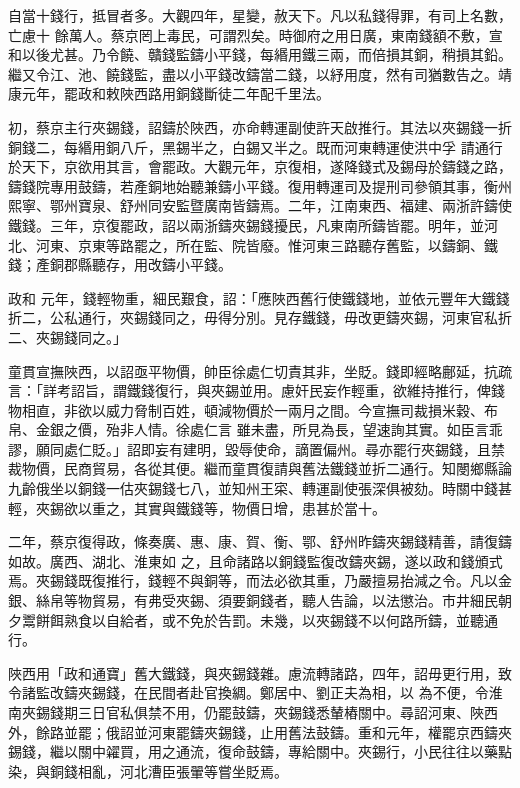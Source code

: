 \begin{pinyinscope}
 自當十錢行，抵冒者多。大觀四年，星變，赦天下。凡以私錢得罪，有司上名數，亡慮十
 餘萬人。蔡京罔上毒民，可謂烈矣。時御府之用日廣，東南錢額不敷，宣和以後尤甚。乃令饒、贛錢監鑄小平錢，每緡用鐵三兩，而倍損其銅，稍損其鉛。繼又令江、池、饒錢監，盡以小平錢改鑄當二錢，以紓用度，然有司猶數告之。靖康元年，罷政和敕陜西路用銅錢斷徒二年配千里法。



 初，蔡京主行夾錫錢，詔鑄於陜西，亦命轉運副使許天啟推行。其法以夾錫錢一折銅錢二，每緡用銅八斤，黑錫半之，白錫又半之。既而河東轉運使洪中孚
 請通行於天下，京欲用其言，會罷政。大觀元年，京復相，遂降錢式及錫母於鑄錢之路，鑄錢院專用鼓鑄，若產銅地始聽兼鑄小平錢。復用轉運司及提刑司參領其事，衡州熙寧、鄂州寶泉、舒州同安監暨廣南皆鑄焉。二年，江南東西、福建、兩浙許鑄使鐵錢。三年，京復罷政，詔以兩浙鑄夾錫錢擾民，凡東南所鑄皆罷。明年，並河北、河東、京東等路罷之，所在監、院皆廢。惟河東三路聽存舊監，以鑄銅、鐵錢；產銅郡縣聽存，用改鑄小平錢。



 政和
 元年，錢輕物重，細民艱食，詔：「應陜西舊行使鐵錢地，並依元豐年大鐵錢折二，公私通行，夾錫錢同之，毋得分別。見存鐵錢，毋改更鑄夾錫，河東官私折二、夾錫錢同之。」



 童貫宣撫陜西，以詔亟平物價，帥臣徐處仁切責其非，坐貶。錢即經略鄜延，抗疏言：「詳考詔旨，謂鐵錢復行，與夾錫並用。慮奸民妄作輕重，欲維持推行，俾錢物相直，非欲以威力脅制百姓，頓減物價於一兩月之間。今宣撫司裁損米穀、布帛、金銀之價，殆非人情。徐處仁言
 雖未盡，所見為長，望速詢其實。如臣言乖謬，願同處仁貶。」詔即妄有建明，毀辱使命，謫置偏州。尋亦罷行夾錫錢，且禁裁物價，民商貿易，各從其便。繼而童貫復請與舊法鐵錢並折二通行。知閿鄉縣論九齡俄坐以銅錢一估夾錫錢七八，並知州王寀、轉運副使張深俱被劾。時關中錢甚輕，夾錫欲以重之，其實與鐵錢等，物價日增，患甚於當十。



 二年，蔡京復得政，條奏廣、惠、康、賀、衡、鄂、舒州昨鑄夾錫錢精善，請復鑄如故。廣西、湖北、淮東如
 之，且命諸路以銅錢監復改鑄夾錫，遂以政和錢頒式焉。夾錫錢既復推行，錢輕不與銅等，而法必欲其重，乃嚴擅易抬減之令。凡以金銀、絲帛等物貿易，有弗受夾錫、須要銅錢者，聽人告論，以法懲治。市井細民朝夕鬻餅餌熟食以自給者，或不免於告罰。未幾，以夾錫錢不以何路所鑄，並聽通行。



 陜西用「政和通寶」舊大鐵錢，與夾錫錢雜。慮流轉諸路，四年，詔毋更行用，致令諸監改鑄夾錫錢，在民間者赴官換綢。鄭居中、劉正夫為相，以
 為不便，令淮南夾錫錢期三日官私俱禁不用，仍罷鼓鑄，夾錫錢悉輦樁關中。尋詔河東、陜西外，餘路並罷；俄詔並河東罷鑄夾錫錢，止用舊法鼓鑄。重和元年，權罷京西鑄夾錫錢，繼以關中糴買，用之通流，復命鼓鑄，專給關中。夾錫行，小民往往以藥點染，與銅錢相亂，河北漕臣張翬等嘗坐貶焉。




\end{pinyinscope}
